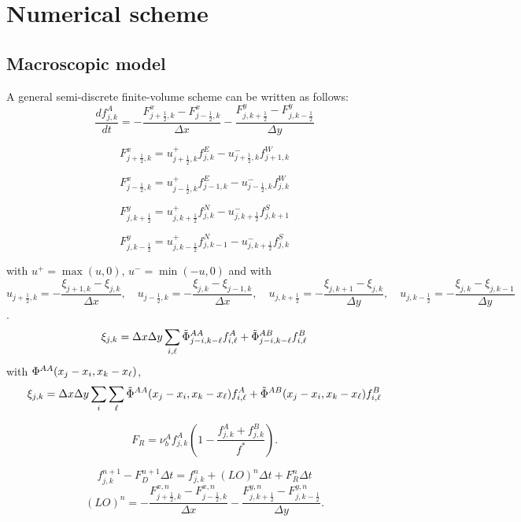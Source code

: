 	\section{Numerical scheme}
	\subsection{Macroscopic model}






A general semi-discrete finite-volume scheme can be written as follows:
\begin{equation}
\frac{d f^{A}_{j,k}}{dt}= -\frac{F^{x}_{j+\frac{1}{2},k}-F^{x}_{j-\frac{1}{2},k}}{\Delta x}-\frac{F^{y}_{j,k+\frac{1}{2}}-F^{y}_{j,k-\frac{1}{2}}}{\Delta y}
\end{equation}

$$ F^{x}_{j+\frac{1}{2},k}=u^{+}_{j+\frac{1}{2},k}f^{E}_{j,k}-
u^{-}_{j+\frac{1}{2},k}f^{W}_{j+1,k}   $$

$$ F^{x}_{j-\frac{1}{2},k}=u^{+}_{j-\frac{1}{2},k}f^{E}_{j-1,k}-
u^{-}_{j-\frac{1}{2},k}f^{W}_{j,k}   $$

$$ F^{y}_{j,k+\frac{1}{2}}=u^{+}_{j,k+\frac{1}{2}}f^{N}_{j,k}-
u^{-}_{j,k+\frac{1}{2}}f^{S}_{j,k+1}   $$

$$ F^{y}_{j,k-\frac{1}{2}}=u^{+}_{j,k-\frac{1}{2}}f^{N}_{j,k-1}-
u^{-}_{j,k+\frac{1}{2}}f^{S}_{j,k}   $$

with $u^{+}=\max(u,0)$, $u^{-}=\min(-u,0)$ and with $$u_{j+\frac{1}{2},k}=-\frac{\xi_{j+1,k}-\xi_{j,k}}{\Delta x}, \quad u_{j-\frac{1}{2},k}=-\frac{\xi_{j,k}-\xi_{j-1,k}}{\Delta x}, \quad u_{j,k+\frac{1}{2}}=-\frac{\xi_{j,k+1}-\xi_{j,k}}{\Delta y}, \quad u_{j,k-\frac{1}{2}}=-\frac{\xi_{j,k}-\xi_{j,k-1}}{\Delta y}$$. \\

$$ \xi_{j,k}=\Delta x \Delta y \sum_{i,{\ell}} \tilde{\Phi}^{AA}_{j-i,k-{\ell}} f^{A}_{i,{\ell}}+
\tilde{\Phi}^{AB}_{j-i,k-{\ell}} f^{B}_{i,{\ell}} $$
with ${\Phi}^{AA}(x_j-x_i,x_k-x_{{\ell}})$,
$$ \xi_{j,k}=\Delta x \Delta y \sum_{i} \sum_{{\ell}} \tilde{\Phi}^{AA}(x_{j}-x_{i},x_{k}-x_{{\ell}}) f^{A}_{i,{\ell}}+
\tilde{\Phi}^{AB}(x_{j}-x_{i},x_{k}-x_{{\ell}}) f^{B}_{i,{\ell}} $$

$$ F_R=\nu_b^{A}f^{A}_{j,k}\left(1-\frac{f^{A}_{j,k}+f^{B}_{j,k}}{f^{*}}\right). $$


\begin{equation}
	f_{j,k}^{n+1}-F_{D}^{n+1} \Delta t= f_{j,k}^{n}+(LO)^{n} \Delta t + F_{R}^{n} \Delta t
\end{equation}
 $$(LO)^{n}=-\frac{F^{x,n}_{j+\frac{1}{2},k}-F^{x,n}_{j-\frac{1}{2},k}}{\Delta x}-\frac{F^{y,n}_{j,k+\frac{1}{2}}-F^{y,n}_{j,k-\frac{1}{2}}}{\Delta y}.	$$
